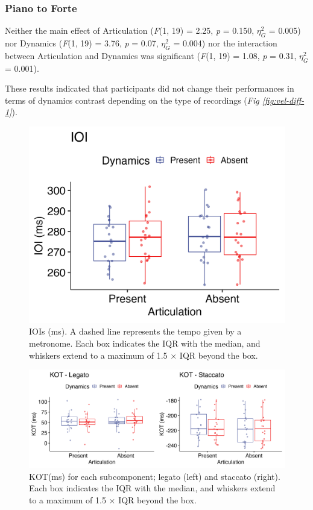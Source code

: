 \documentclass[
  man,floatsintext]{apa6}
\begin{document}
\hypertarget{piano-to-forte}{%
\subsubsection{Piano to Forte}\label{piano-to-forte}}

Neither the main effect of Articulation (\emph{F}(1, 19) = 2.25, \emph{p} = 0.150, \(\eta_G^2\) = 0.005) nor Dynamics (\emph{F}(1, 19) = 3.76, \emph{p} = 0.07, \(\eta_G^2\) = 0.004) nor the interaction between Articulation and Dynamics was significant (\emph{F}(1, 19) = 1.08, \emph{p} = 0.31, \(\eta_G^2\) = 0.001).

These results indicated that participants did not change their performances in terms of dynamics contrast depending on the type of recordings (\emph{Fig \ref{fig:vel-diff-1}}).

\begin{figure}
\includegraphics[width=1\linewidth]{manuscript_files/figure-latex/plot-ioi-1-1} \caption{\label{fig:ioi-1}IOIs (ms). A dashed line represents the tempo given by a metronome. Each box indicates the IQR with the median, and whiskers extend to a maximum of 1.5 × IQR beyond the box.}\label{fig:plot-ioi-1}
\end{figure}

\begin{figure}
\includegraphics[width=1\linewidth]{manuscript_files/figure-latex/plot-kot-1-1} \caption{\label{fig:kot-1}KOT(ms) for each subcomponent; legato (left) and staccato (right). Each box indicates the IQR with the median, and whiskers extend to a maximum of 1.5 × IQR beyond the box.}\label{fig:plot-kot-1}
\end{figure}
\end{document}
